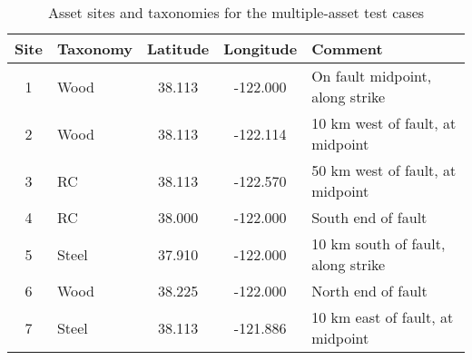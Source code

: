 \begin{table}

\centering
\begin{tabular}{ c l c c l }

\hline
\rowcolor{anti-flashwhite}
\bf{Site} & \bf{Taxonomy} & \bf{Latitude} & \bf{Longitude} & \bf{Comment} \\
\hline
1 & Wood & 38.113 & -122.000 & On fault midpoint, along strike \\
2 & Wood & 38.113 & -122.114 & 10 km west of fault, at midpoint \\
3 & RC & 38.113 & -122.570 & 50 km west of fault, at midpoint \\
4 & RC & 38.000 & -122.000 & South end of fault \\
5 & Steel & 37.910 & -122.000 & 10 km south of fault, along strike \\
6 & Wood & 38.225 & -122.000 & North end of fault \\
7 & Steel & 38.113 & -121.886 & 10 km east of fault, at midpoint \\
\hline
\end{tabular}

\caption{Asset sites and taxonomies for the multiple-asset test cases}
\label{tab:assets}
\end{table}
